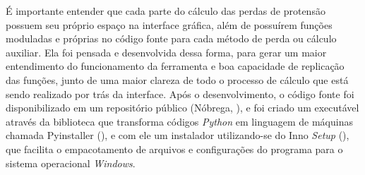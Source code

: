 É importante entender que cada parte do cálculo das perdas de protensão possuem seu próprio espaço na interface gráfica, além de possuírem funções moduladas e próprias no código fonte para cada método de perda ou cálculo auxiliar. Ela foi pensada e desenvolvida dessa forma, para gerar um maior entendimento do funcionamento da ferramenta e boa capacidade de replicação das funções, junto de uma maior clareza de todo o processo de cálculo que está sendo realizado por trás da interface. Após o desenvolvimento, o código fonte foi disponibilizado em um repositório público (Nóbrega, \citeyear{nobrega}), e foi criado um executável através da biblioteca que transforma códigos \textit{Python} em linguagem de máquinas chamada Pyinstaller (\citeyear{PyI}), e com ele um instalador utilizando-se do Inno \textit{Setup} (\citeyear{IS}), que facilita o empacotamento de arquivos e configurações do programa para o sistema operacional \textit{Windows}.